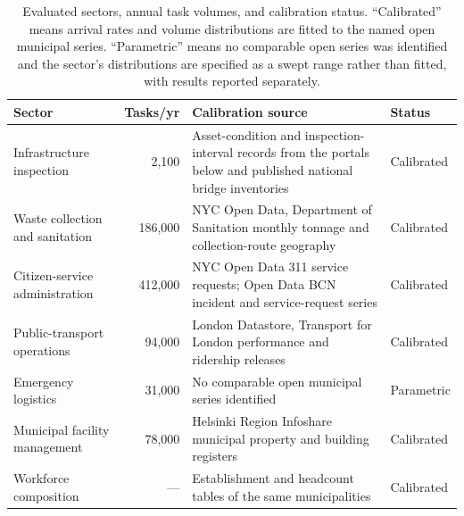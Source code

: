 	\begin{table}[!htbp]
		\caption{Evaluated sectors, annual task volumes, and calibration status. ``Calibrated'' means arrival rates and volume distributions are fitted to the named open municipal series. ``Parametric'' means no comparable open series was identified and the sector's distributions are specified as a swept range rather than fitted, with results reported separately.}
		\label{tab:sectors}
		\small
		\begin{tabularx}{\textwidth}{@{}lrXl@{}}
			\toprule
			\textbf{Sector} & \textbf{Tasks/yr} & \textbf{Calibration source} & \textbf{Status}\\
			\midrule
			Infrastructure inspection & 2{,}100 & Asset-condition and inspection-interval records from the portals below and published national bridge inventories & Calibrated\\
			Waste collection and sanitation & 186{,}000 & NYC Open Data, Department of Sanitation monthly tonnage and collection-route geography & Calibrated\\
			Citizen-service administration & 412{,}000 & NYC Open Data 311 service requests; Open Data BCN incident and service-request series & Calibrated\\
			Public-transport operations & 94{,}000 & London Datastore, Transport for London performance and ridership releases & Calibrated\\
			Emergency logistics & 31{,}000 & No comparable open municipal series identified & Parametric\\
			Municipal facility management & 78{,}000 & Helsinki Region Infoshare municipal property and building registers & Calibrated\\
			Workforce composition & --- & Establishment and headcount tables of the same municipalities & Calibrated\\
			\bottomrule
		\end{tabularx}
	\end{table}
	

